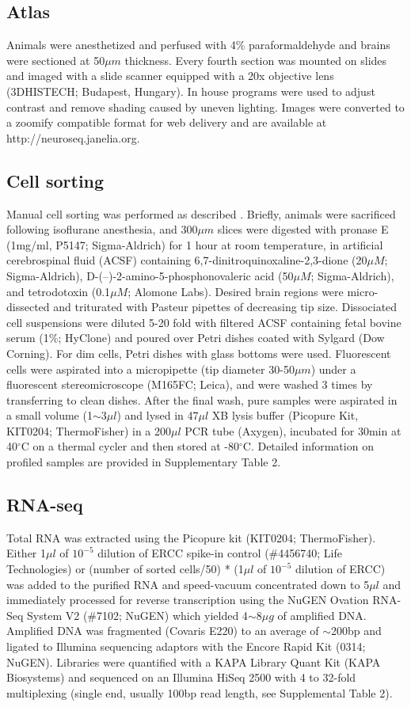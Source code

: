 \subsection{Atlas}
Animals were anesthetized and perfused with 4\% paraformaldehyde and brains were sectioned at 50$\mu m$ thickness. Every fourth section was mounted on slides and imaged with a slide scanner equipped with a 20x objective lens (3DHISTECH; Budapest, Hungary). In house programs were used to adjust contrast and remove shading caused by uneven lighting. Images were converted to a zoomify compatible format for web delivery and are available at http://neuroseq.janelia.org.

\subsection{Cell sorting}
Manual cell sorting was performed as described \citep{Hempel_2007, Sugino_2014}. Briefly, animals were sacrificed following isoflurane anesthesia, and 300$\mu m$ slices were digested with pronase E (1mg/ml, P5147; Sigma-Aldrich) for 1 hour at room temperature, in artificial cerebrospinal fluid (ACSF) containing 6,7-dinitroquinoxaline-2,3-dione (20$\mu M$; Sigma-Aldrich), D-(–)-2-amino-5-phosphonovaleric acid (50$\mu M$; Sigma-Aldrich), and tetrodotoxin (0.1$\mu M$; Alomone Labs). Desired brain regions were micro-dissected and triturated with Pasteur pipettes of decreasing tip size. Dissociated cell suspensions were diluted 5-20 fold with filtered ACSF containing fetal bovine serum (1\%; HyClone) and poured over Petri dishes coated with Sylgard (Dow Corning). For dim cells, Petri dishes with glass bottoms were used. Fluorescent cells were aspirated into a micropipette (tip diameter 30-50$\mu m$) under a fluorescent stereomicroscope (M165FC; Leica), and were washed 3 times by transferring to clean dishes. After the final wash, pure samples were aspirated in a small volume (1$\sim$3$\mu l$) and lysed in 47$\mu l$ XB lysis buffer (Picopure Kit, KIT0204; ThermoFisher) in a 200$\mu l$ PCR tube (Axygen), incubated for 30min at 40$^{\circ}$C on a thermal cycler and then stored at -80$^{\circ}$C. Detailed information on profiled samples are provided in Supplementary Table 2.

\subsection{RNA-seq}
Total RNA was extracted using the Picopure kit (KIT0204; ThermoFisher). Either 1$\mu l$ of $10^{-5}$ dilution of ERCC spike-in control (\#4456740; Life Technologies) or (number of sorted cells/50) * (1$\mu l$ of $10^{-5}$ dilution of ERCC) was added to the purified RNA and speed-vacuum concentrated down to 5$\mu l$ and immediately processed for reverse transcription using the NuGEN Ovation RNA-Seq System V2 (\#7102; NuGEN) which yielded 4$\sim$8$\mu g$ of amplified DNA. Amplified DNA was fragmented (Covaris E220) to an average of $\sim$200bp and ligated to Illumina sequencing adaptors with the Encore Rapid Kit (0314; NuGEN). Libraries were quantified with a KAPA Library Quant Kit (KAPA Biosystems) and sequenced on an Illumina HiSeq 2500 with 4 to 32-fold multiplexing (single end, usually 100bp read length, see Supplemental Table 2).

